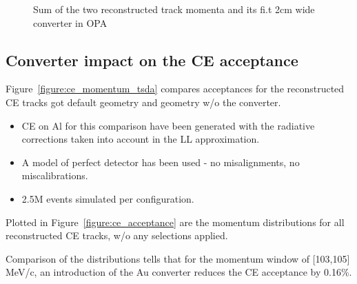 \begin{figure}[H]
  \caption{
    \label{figure:t2_1_smom_0}
    Sum of the two reconstructed track momenta and its fi.t 2cm wide converter in OPA
  }
  \label{figure:event_display}
\end{figure}

\newpage
\subsection{Converter impact on the CE acceptance}

Figure~\ref{figure:ce_momentum_tsda} compares acceptances for the reconstructed CE tracks
got default geometry and geometry w/o the converter.
\begin{itemize}
\item 
  CE on Al for this comparison have been generated with the radiative corrections
  taken into account in the LL approximation.
\item 
  A model of perfect detector has been used - no misalignments, no miscalibrations.
\item
  2.5M events simulated per configuration.
\end{itemize}

Plotted in Figure~\ref{figure:ce_acceptance} are the momentum distributions for all
reconstructed CE tracks, w/o any selections applied. 

Comparison of the distributions tells that for the momentum window of [103,105] MeV/c,
an introduction of the Au converter reduces the CE acceptance by 0.16\%.

